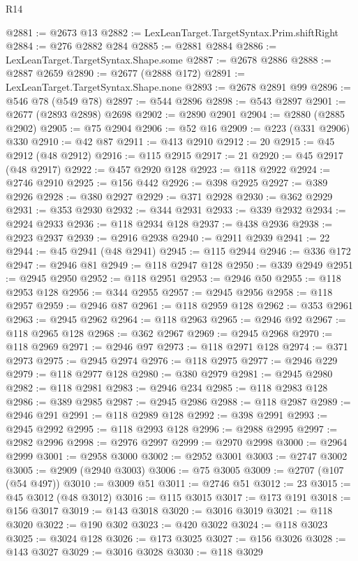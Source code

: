 \begin{lexlean}{R14}
\begin{coremodule}
@2881 := @2673 @13
@2882 := LexLeanTarget.TargetSyntax.Prim.shiftRight
@2884 := @276 @2882 @284
@2885 := @2881 @2884
@2886 := LexLeanTarget.TargetSyntax.Shape.some
@2887 := @2678 @2886
@2888 := @2887 @2659
@2890 := @2677 (@2888 @172)
@2891 := LexLeanTarget.TargetSyntax.Shape.none
@2893 := @2678 @2891 @99
@2896 := @546 @78 (@549 @78)
@2897 := @544 @2896
@2898 := @543 @2897
@2901 := @2677 (@2893 @2898) @2698
@2902 := @2890 @2901
@2904 := @2880 (@2885 @2902)
@2905 := @75 @2904
@2906 := @52 @16
@2909 := @223 (@331 @2906) @330
@2910 := @42 @87
@2911 := @413 @2910
@2912 := 20
@2915 := @45 @2912 (@48 @2912)
@2916 := @115 @2915
@2917 := 21
@2920 := @45 @2917 (@48 @2917)
@2922 := @457 @2920 @128
@2923 := @118 @2922
@2924 := @2746 @2910
@2925 := @156 @442
@2926 := @398 @2925
@2927 := @389 @2926
@2928 := @380 @2927
@2929 := @371 @2928
@2930 := @362 @2929
@2931 := @353 @2930
@2932 := @344 @2931
@2933 := @339 @2932
@2934 := @2924 @2933
@2936 := @118 @2934 @128
@2937 := @438 @2936
@2938 := @2923 @2937
@2939 := @2916 @2938
@2940 := @2911 @2939
@2941 := 22
@2944 := @45 @2941 (@48 @2941)
@2945 := @115 @2944
@2946 := @336 @172
@2947 := @2946 @81
@2949 := @118 @2947 @128
@2950 := @339 @2949
@2951 := @2945 @2950
@2952 := @118 @2951
@2953 := @2946 @50
@2955 := @118 @2953 @128
@2956 := @344 @2955
@2957 := @2945 @2956
@2958 := @118 @2957
@2959 := @2946 @87
@2961 := @118 @2959 @128
@2962 := @353 @2961
@2963 := @2945 @2962
@2964 := @118 @2963
@2965 := @2946 @92
@2967 := @118 @2965 @128
@2968 := @362 @2967
@2969 := @2945 @2968
@2970 := @118 @2969
@2971 := @2946 @97
@2973 := @118 @2971 @128
@2974 := @371 @2973
@2975 := @2945 @2974
@2976 := @118 @2975
@2977 := @2946 @229
@2979 := @118 @2977 @128
@2980 := @380 @2979
@2981 := @2945 @2980
@2982 := @118 @2981
@2983 := @2946 @234
@2985 := @118 @2983 @128
@2986 := @389 @2985
@2987 := @2945 @2986
@2988 := @118 @2987
@2989 := @2946 @291
@2991 := @118 @2989 @128
@2992 := @398 @2991
@2993 := @2945 @2992
@2995 := @118 @2993 @128
@2996 := @2988 @2995
@2997 := @2982 @2996
@2998 := @2976 @2997
@2999 := @2970 @2998
@3000 := @2964 @2999
@3001 := @2958 @3000
@3002 := @2952 @3001
@3003 := @2747 @3002
@3005 := @2909 (@2940 @3003)
@3006 := @75 @3005
@3009 := @2707 (@107 (@54 @497))
@3010 := @3009 @51
@3011 := @2746 @51
@3012 := 23
@3015 := @45 @3012 (@48 @3012)
@3016 := @115 @3015
@3017 := @173 @191
@3018 := @156 @3017
@3019 := @143 @3018
@3020 := @3016 @3019
@3021 := @118 @3020
@3022 := @190 @302
@3023 := @420 @3022
@3024 := @118 @3023
@3025 := @3024 @128
@3026 := @173 @3025
@3027 := @156 @3026
@3028 := @143 @3027
@3029 := @3016 @3028
@3030 := @118 @3029

\end{coremodule}
\end{lexlean}
